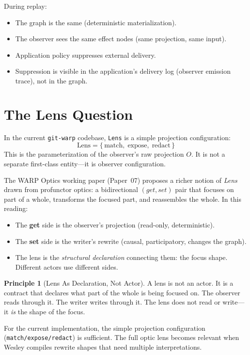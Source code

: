 \documentclass[11pt]{article}
\theoremstyle{definition}
\newtheorem{principle}{Principle}
\begin{document}
During replay:
\begin{itemize}[leftmargin=2em]
\item The graph is the same (deterministic materialization).
\item The observer sees the same effect nodes (same projection, same
  input).
\item Application policy suppresses external delivery.
\item Suppression is visible in the application's delivery log
  (observer emission trace), not in the graph.
\end{itemize}

\section{The Lens Question}

In the current \texttt{git-warp} codebase, \texttt{Lens} is a simple
projection configuration:
\[
\text{Lens} = \{\, \text{match},\; \text{expose},\; \text{redact} \,\}
\]
This is the parameterization of the observer's raw projection $O$.
It is not a separate first-class entity---it is observer configuration.

The WARP Optics working paper (Paper~07) proposes a richer notion of
\emph{Lens} drawn from profunctor optics: a bidirectional
$(get, set)$ pair that focuses on part of a whole, transforms the
focused part, and reassembles the whole. In this reading:

\begin{itemize}[leftmargin=2em]
\item The \textbf{get} side is the observer's projection (read-only,
  deterministic).
\item The \textbf{set} side is the writer's rewrite (causal,
  participatory, changes the graph).
\item The lens is the \emph{structural declaration} connecting them:
  the focus shape. Different actors use different sides.
\end{itemize}

\begin{principle}[Lens As Declaration, Not Actor]
A lens is not an actor. It is a contract that declares what part of
the whole is being focused on. The observer reads through it. The
writer writes through it. The lens does not read or write---it
\emph{is} the shape of the focus.
\end{principle}

For the current implementation, the simple projection configuration
(\texttt{match/expose/redact}) is sufficient. The full optic lens
becomes relevant when Wesley compiles rewrite shapes that need
multiple interpretations.
\end{document}
